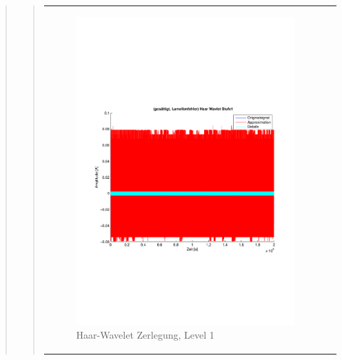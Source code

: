 \begin{quote}
\begin{quote}
\begin{center}
\begin{tabular}{ll}
\begin{minipage}{0.6\textwidth}
                        \begin{figure}[H]
                            \label{fig:}
                            \includegraphics[scale=0.4, trim = 2cm 6cm 1cm
                            7.5cm,
                            clip]{./Bilder/Termin8/lamellenfehler_gesaettigt_Haar_Wavlet_lvl_1}
                            \caption{Haar-Wavelet Zerlegung, Level 1}
                        \end{figure}
    
                    \end{minipage}
                    \begin{minipage}{0.6\textwidth}
    

\end{minipage}
\end{tabular}
\end{center}
\end{quote}
\end{quote}

